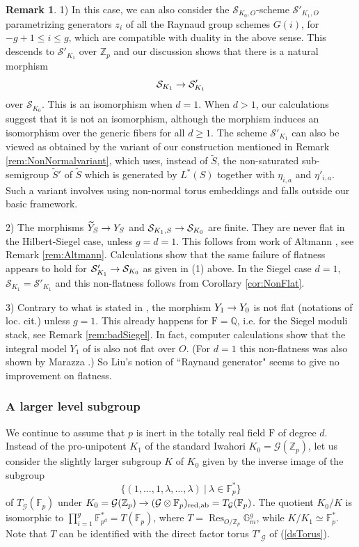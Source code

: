 \documentclass[reqno, 10pt]{amsart}
\makeatletter
\newcommand{\BF}{\ensuremath{\mathbb {F}}\xspace}
\newcommand{\BG}{\ensuremath{\mathbb {G}}\xspace}
\newcommand{\BQ}{\ensuremath{\mathbb {Q}}\xspace}
\newcommand{\BZ}{\ensuremath{\mathbb {Z}}\xspace}
\newcommand{\CG}{\ensuremath{\mathcal {G}}\xspace}
\newcommand{\CS}{\ensuremath{\mathcal {S}}\xspace}
\newcommand{\RF}{\ensuremath{\mathrm {F}}\xspace}
\newcommand{\red}{\ensuremath{\mathrm{red}}\xspace}
\DeclareMathOperator{\Res}{Res}
\newcommand{\wt}{\widetilde}
\theoremstyle{definition}
\newtheorem{remark}[subsubsection]{Remark}
\numberwithin{equation}{subsection}
\numberwithin{subsubsection}{subsection}
\renewcommand{\to}{%
   \ifbool{@display}{\longrightarrow}{\rightarrow}%
   }
\makeatother
\begin{document}
\begin{remark}\label{rem:HilbertSiegel}
1) In this case, we can also consider the $\CS_{K_0, O}$-scheme $\CS'_{K_1, O}$ parametrizing generators $z_i$ of all the Raynaud group schemes $G(i)$, for $-g+1\leq i\leq g$, which are compatible with duality in the above sense. This descends to $\CS'_{K_1}$ over $\BZ_p$ and our discussion shows that there is a natural morphism
\[
\CS_{K_1}\to \CS'_{K_1}
\]
over $\CS_{K_0}$. This is an isomorphism when $d=1$. When $d>1$, our calculations suggest that it is not an isomorphism, although the morphism induces an isomorphism over the generic fibers for all $d\geq 1$. The scheme $\CS'_{K_1}$ can also be viewed as obtained 
by the variant of our construction mentioned in Remark \ref{rem:NonNormalvariant}, which uses, instead of $\wt S$, the non-saturated sub-semigroup $\wt S'$ of $\wt S$ which is generated by $L^*(S)$ together with $\eta_{i,a}$ and $\eta'_{i,a}$. Such a variant involves using non-normal torus embeddings and falls outside our basic framework.

2) The morphisms $\wt Y_S\to Y_S$ and $\CS_{K_1, S}\to \CS_{K_0}$  are finite. They are never flat in the Hilbert-Siegel case, unless $g=d=1$.
This follows from work of Altmann \cite{Alt}, see Remark \ref{rem:Altmann}. Calculations show that the same failure of flatness appears to hold for $\CS'_{K_1}\to \CS_{K_0}$ as given in (1) above. In the Siegel case $d=1$,  $\CS_{K_1}= \CS'_{K_1} $ and this non-flatness follows from Corollary \ref{cor:NonFlat}. 

3) Contrary to what is stated in \cite[Rem. 3.10]{SLiu}, the morphism $Y_1\to Y_0$ is not flat (notations of loc. cit.) unless $g=1$.
This already happens for $\RF=\BQ$, i.e. for the Siegel moduli stack, see Remark \ref{rem:badSiegel}.  
 In fact, computer calculations show that the integral model $Y_1$ of \cite{SLiu} is also not flat over $O$. (For $d=1$ this non-flatness was also shown by Marazza \cite{Marazza}.) So Liu's notion of ``Raynaud generator" seems to give no improvement on flatness.
 \end{remark}

  \subsubsection{A larger level subgroup}\label{sss:HSsmaller}
 We continue to assume  that $p$ is inert in the totally real field $\RF$ of degree $d$. 
Instead of the pro-unipotent $K_1$ of the standard Iwahori $K_0=\CG(\BZ_p)$, let us consider the slightly larger subgroup $K$ of $K_0$ given by the inverse image of the subgroup
\[
\{(1,\ldots, 1,\lambda,\ldots, \lambda)\ |\ \lambda\in \BF_p^*\}
\]
of $T_\CG(\BF_p)$ under $K_0=\CG(\BZ_p)\to (\CG\otimes\BF_p)_{\red,\rm ab}=T_\CG(\BF_p)$.  The quotient $K_0/K$ is isomorphic to $\prod_{i=1}^g\BF_{p^d}^*=T(\BF_p)$, where $T=\Res_{O/\BZ_p}\BG_m^g$, while $K/K_1\simeq \BF_p^*$. Note that $T$ can be identified with the direct factor torus $T'_\CG$ of (\ref{dsTorus}).  
\end{document}

